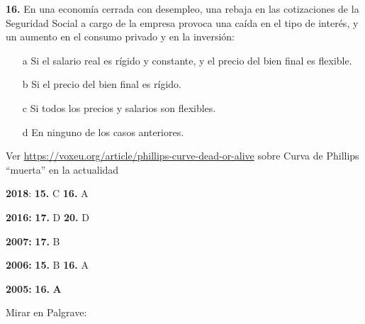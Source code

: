 \documentclass{nuevotema}
\begin{document}
\textbf{16.} En una economía cerrada con desempleo, una rebaja en las cotizaciones de la Seguridad Social a cargo de la empresa provoca una caída en el tipo de interés, y un aumento en el consumo privado y en la inversión:

\begin{itemize}
	\item[a] Si el salario real es rígido y constante, y el precio del bien final es flexible.
	\item[b] Si el precio del bien final es rígido.
	\item[c] Si todos los precios y salarios son flexibles.
	\item[d] En ninguno de los casos anteriores.
\end{itemize}


\notas


Ver \url{https://voxeu.org/article/phillips-curve-dead-or-alive} sobre Curva de Phillips ``muerta'' en la actualidad

\textbf{2018}: \textbf{15.} C \textbf{16.} A

\textbf{2016:} \textbf{17.} D \textbf{20.} D

\textbf{2007:} \textbf{17.} B

\textbf{2006:} \textbf{15.} B \textbf{16.} A

\textbf{2005:} \textbf{16.} \textbf{A}

\bibliografia

Mirar en Palgrave:
\end{document}
